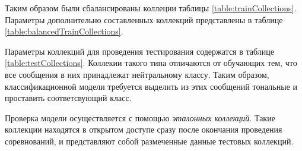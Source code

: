     Таким образом были сбалансированы коллеции таблицы \ref{table:trainCollections}.
    Параметры дополнительно составленных коллекций представлены
    в таблице \ref{table:balancedTrainCollections}.

    

    Параметры коллекций для проведения тестирования содержатся в таблице
    \ref{table:testCollections}.
    Коллекии такого типа отличаются от обучающих тем, что все сообщения в них
    принадлежат нейтральному классу.
    Таким образом, классификационной модели требуется выделить из этих сообщений
    тональные и проставить соответсвующий класс.

    

    Проверка модели осуществляется с помощью {\it эталонных коллекций}.
    Такие коллекции находятся в открытом доступе сразу после окончания
    проведения соревнований, и представляют собой размеченные данные
    тестовых коллекций.
